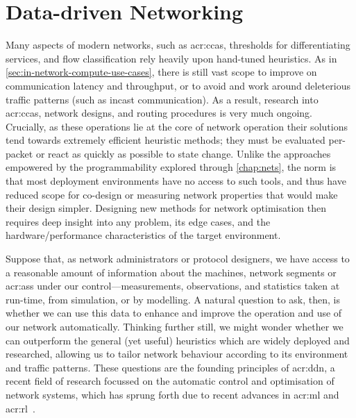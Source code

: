 \chapter{Data-driven Networking}\label{chap:ddn}
Many aspects of modern networks, such as \glspl{acr:cca}, thresholds for differentiating services, and flow classification rely heavily upon hand-tuned heuristics.
As in \cref{sec:in-network-compute-use-cases}, there is still vast scope to improve on communication latency and throughput, or to avoid and work around deleterious traffic patterns (such as incast communication).
As a result, research into \glspl{acr:cca}, network designs, and routing procedures is very much ongoing.
Crucially, as these operations lie at the core of network operation their solutions tend towards extremely efficient heuristic methods; they must be evaluated per-packet or react as quickly as possible to state change.
Unlike the approaches empowered by the programmability explored through \cref{chap:nets}, the norm is that most deployment environments have no access to such tools, and thus have reduced scope for co-design or measuring network properties that would make their design simpler.
Designing new methods for network optimisation then requires deep insight into any problem, its edge cases, and the hardware/performance characteristics of the target environment.

Suppose that, as network administrators or protocol designers, we have access to a reasonable amount of information about the machines, network segments or \glspl{acr:as} under our control---measurements, observations, and statistics taken at run-time, from simulation, or by modelling.
A natural question to ask, then, is whether we can use this data to enhance and improve the operation and use of our network automatically.
Thinking further still, we might wonder whether we can outperform the general (yet useful) heuristics which are widely deployed and researched, allowing us to tailor network behaviour according to its environment and traffic patterns.
These questions are the founding principles of \gls{acr:ddn}, a recent field of research focussed on the automatic control and optimisation of network systems, which has sprung forth due to recent advances in \gls{acr:ml} and \gls{acr:rl}~\parencite{DBLP:conf/anrw/FeamsterR18,DBLP:journals/pieee/KellererKBBR019}.

